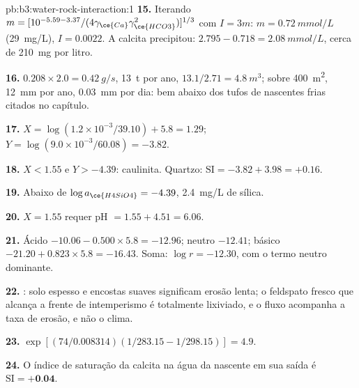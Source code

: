 \begin{solution}{pb:b3:water-rock-interaction:1}
\textbf{15.} Iterando $m = [10^{-5.59 - 3.37}/(4\gamma_{\ce{Ca}}
\gamma_{\ce{HCO3}}^2)]^{1/3}$ com $I = 3m$: $m = \qty{0.72}{mmol/L}$
(\qty{29}{mg/L}), $I = 0.0022$. A calcita precipitou: $2.795 - 0.718 =
\qty{2.08}{mmol/L}$, cerca de \qty{210}{mg} por litro.

\textbf{16.} $0.208\times2.0 = \qty{0.42}{g/s}$, \qty{13}{t} por ano,
$13.1/2.71 = \qty{4.8}{m^3}$; sobre \qty{400}{m^2}, \qty{12}{mm} por ano,
\qty{0.03}{mm} por dia: bem abaixo dos tufos de nascentes frias citados no capítulo.

\textbf{17.} $X = \log(1.2\times10^{-3}/39.10) + 5.8 = 1.29$; $Y =
\log(9.0\times10^{-3}/60.08) = -3.82$.

\textbf{18.} $X < 1.55$ e $Y > -4.39$: caulinita. Quartzo: $\mathrm{SI} =
-3.82 + 3.98 = +0.16$.

\textbf{19.} Abaixo de $\log a_{\ce{H4SiO4}} = -4.39$, \qty{2.4}{mg/L} de
sílica.

\textbf{20.} $X = 1.55$ requer pH $= 1.55 + 4.51 = 6.06$.

\textbf{21.} Ácido $-10.06 - 0.500\times5.8 = -12.96$; neutro $-12.41$; básico
$-21.20 + 0.823\times5.8 = -16.43$. Soma: $\log r = -12.30$, com o termo neutro
dominante.

\textbf{22.} : solo espesso e encostas suaves significam erosão lenta;
o feldspato fresco que alcança a frente de intemperismo é totalmente lixiviado, e
o fluxo acompanha a taxa de erosão, e não o clima.

\textbf{23.} $\exp[(74/0.008314)(1/283.15 - 1/298.15)] = 4.9$.

\textbf{24.} O índice de saturação da calcita na água da nascente em sua saída
é $\mathrm{SI} = \textbf{+0.04}$.
\end{solution}
